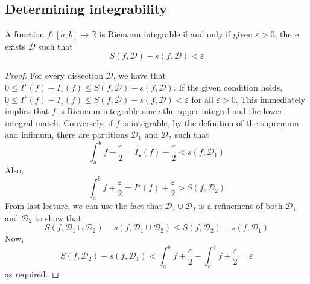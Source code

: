 \subsection{Determining integrability}
\begin{theorem}
	A function \(f \colon [a, b] \to \mathbb R\) is Riemann integrable if and only if given \(\varepsilon > 0\), there exists \(\mathcal D\) such that
	\[
		S(f, \mathcal D) - s(f, \mathcal D) < \varepsilon
	\]
\end{theorem}
\begin{proof}
	For every dissection \(\mathcal D\), we have that \(0 \leq I^\star(f) - I_\star(f) \leq S(f, \mathcal D) - s(f, \mathcal D)\).
	If the given condition holds, \(0 \leq I^\star(f) - I_\star(f) \leq S(f, \mathcal D) - s(f, \mathcal D) < \varepsilon\) for all \(\varepsilon > 0\).
	This immediately implies that \(f\) is Riemann integrable since the upper integral and the lower integral match.
	Conversely, if \(f\) is integrable, by the definition of the supremum and infimum, there are partitions \(\mathcal D_1\) and \(\mathcal D_2\) such that
	\[
		\int_a^b f - \frac{\varepsilon}{2} = I_\star(f) - \frac{\varepsilon}{2} < s(f, \mathcal D_1)
	\]
	Also,
	\[
		\int_a^b f + \frac{\varepsilon}{2} = I^\star(f) + \frac{\varepsilon}{2} > S(f, \mathcal D_2)
	\]
	From last lecture, we can use the fact that \(\mathcal D_1 \cup \mathcal D_2\) is a refinement of both \(\mathcal D_1\) and \(\mathcal D_2\) to show that
	\[
		S(f, \mathcal D_1 \cup \mathcal D_2) - s(f, \mathcal D_1 \cup \mathcal D_2) \leq S(f, \mathcal D_2) - s(f, \mathcal D_1)
	\]
	Now,
	\[
		S(f, \mathcal D_2) - s(f, \mathcal D_1) < \int_a^b f + \frac{\varepsilon}{2} - \int_a^b f + \frac{\varepsilon}{2} = \varepsilon
	\]
	as required.
\end{proof}

